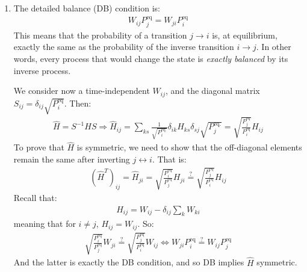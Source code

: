 \documentclass[../template.tex]{subfiles}
\begin{document}
\begin{exo}
\begin{enumerate}
        \item The detailed balance (DB) condition is:
        \begin{align*}
            W_{ij} P_j^{\mathrm{eq}} = W_{ji} P_i^{\mathrm{eq}}
        \end{align*}
        This means that the probability of a transition $j \to i$ is, at equilibrium, exactly the same as the probability of the inverse transition $i \to j$. In other words, every process that would change the state is \textit{exactly balanced} by its inverse process.  

        We consider now a time-independent $W_{ij}$, and the diagonal matrix $S_{ij} = \delta_{ij} \sqrt{P_i^{\mathrm{eq}}}$. Then:
        \begin{align*}
            \hat{H} = S^{-1} H S \Rightarrow 
            \hat{H}_{ij} = \sum_{ks}  \frac{1}{\sqrt{P_i^{\mathrm{eq.}} }} \delta_{ik}H_{ks} \delta_{sj} \sqrt{P_j^{\mathrm{eq.}}} = \sqrt{\frac{P_j^{\mathrm{eq} }}{P_i^{\mathrm{eq}}} } H_{ij}
        \end{align*} 
        To prove that $\hat{H}$ is symmetric, we need to show that the off-diagonal elements remain the same after inverting $j \leftrightarrow i$. That is:
        \begin{align*}
            (\hat{H}^T)_{ij} = \hat{H}_{ji} = \sqrt{\frac{P_i^{\mathrm{eq} }}{P_j^{\mathrm{eq}}} } H_{ji} \overset{?}{=}  \sqrt{\frac{P_j^{\mathrm{eq} }}{P_i^{\mathrm{eq}}} } H_{ij}
        \end{align*}
        Recall that:
        \begin{align*}
            H_{ij} = W_{ij} - \delta_{ij} \sum_k W_{ki}
        \end{align*}
        meaning that for $i \neq j$, $H_{ij} = W_{ij}$. So:
        \begin{align*}
            \sqrt{\frac{P_i^{\mathrm{eq} }}{P_j^{\mathrm{eq}}} } W_{ji} \overset{?}{=}  \sqrt{\frac{P_j^{\mathrm{eq} }}{P_i^{\mathrm{eq}}} } W_{ij} \Leftrightarrow  W_{ji} P_i^{\mathrm{eq}} \overset{?}{=} W_{ij} P_{j}^{\mathrm{eq}}
        \end{align*}
        And the latter is exactly the DB condition, and so DB implies $\hat{H}$ symmetric.


\end{enumerate}
\end{exo}
\end{document}
